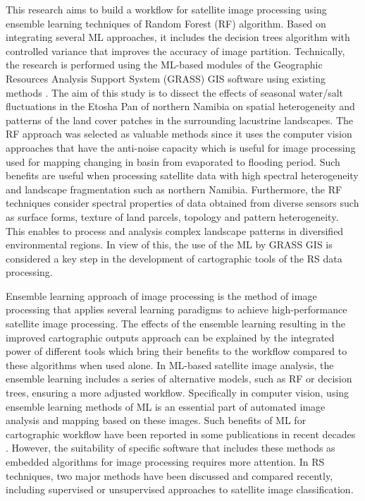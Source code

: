 \documentclass[climate,article,submit,pdftex,moreauthors]{Definitions/mdpi}
\begin{document}
This research aims to build a workflow for satellite image processing using ensemble learning techniques of Random Forest (RF) algorithm. Based on integrating several ML approaches, it includes the decision trees algorithm with controlled variance that improves the accuracy of image partition. Technically, the research is performed using the ML-based modules of the Geographic Resources Analysis Support System (GRASS) GIS software using existing methods \cite{lemenkova2025automation}. The aim of this study is to dissect the effects of seasonal water/salt fluctuations in the Etosha Pan of northern Namibia on spatial heterogeneity and patterns of the land cover patches in the surrounding lacustrine landscapes. The RF approach was selected as valuable methods since it uses the computer vision approaches that have the anti-noise capacity which is useful for image processing used for mapping changing in basin from evaporated to flooding period. Such benefits are useful when processing satellite data with high spectral heterogeneity and landscape fragmentation such as northern Namibia. Furthermore, the RF techniques consider spectral properties of data obtained from diverse sensors such as surface forms, texture of land parcels, topology and pattern heterogeneity. This enables to process and analysis complex landscape patterns in diversified environmental regions. In view of this, the use of the ML by GRASS GIS is considered a key step in the development of cartographic tools of the RS data processing.

Ensemble learning approach of image processing is the method of image processing that applies several learning paradigms to achieve high-performance satellite image processing. The effects of the ensemble learning resulting in the improved cartographic outputs approach can be explained by the integrated power of different tools which bring their benefits to the workflow compared to these algorithms when used alone. In ML-based satellite image analysis, the ensemble learning includes a series of alternative models, such as RF or decision trees, ensuring a more adjusted workflow. Specifically in computer vision, using ensemble learning methods of ML is an essential part of automated image analysis and mapping based on these images. Such benefits of ML for cartographic workflow have been reported in some publications in recent decades \cite{YOO2019155,SINGH2021100624,MULIK2023106697}. However, the suitability of specific software that includes these methods as embedded algorithms for image processing requires more attention. In RS techniques, two major methods have been discussed and compared recently, including supervised \cite{GOLDBLATT2018253,MARTINEZMONTOYA2010978,INZANA200359} or unsupervised \cite{SHIH199497,LU2023116898,Lemenkova202322} approaches to satellite image classification.
\end{document}
